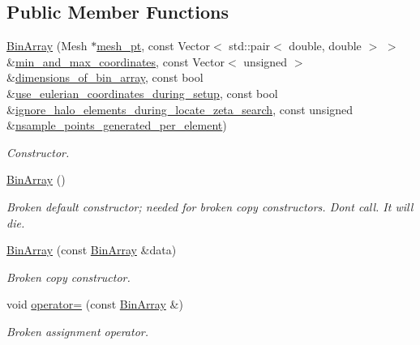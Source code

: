 \subsection*{Public Member Functions}
\begin{DoxyCompactItemize}
\item 
\hyperlink{classBinArray_ae441b5dcc0d0276f4661a09ff735b581}{Bin\+Array} (Mesh $\ast$\hyperlink{classSamplePointContainer_ae170916821b5f8f00255d251cd7f2d8c}{mesh\+\_\+pt}, const Vector$<$ std\+::pair$<$ double, double $>$ $>$ \&\hyperlink{classSamplePointContainer_a6799027f7c569176934457b17bfddf0f}{min\+\_\+and\+\_\+max\+\_\+coordinates}, const Vector$<$ unsigned $>$ \&\hyperlink{classBinArray_a527596c024da9b9baf817778af18704a}{dimensions\+\_\+of\+\_\+bin\+\_\+array}, const bool \&\hyperlink{classSamplePointContainer_a6b6b42a9e6bd8f116af8699e03a78d44}{use\+\_\+eulerian\+\_\+coordinates\+\_\+during\+\_\+setup}, const bool \&\hyperlink{classSamplePointContainer_a399d246c1afdfd993ceb80e6f2de1400}{ignore\+\_\+halo\+\_\+elements\+\_\+during\+\_\+locate\+\_\+zeta\+\_\+search}, const unsigned \&\hyperlink{classSamplePointContainer_a48e5ae762e0d56f67645ce4e7dd886d7}{nsample\+\_\+points\+\_\+generated\+\_\+per\+\_\+element})
\begin{DoxyCompactList}\small\item\em Constructor. \end{DoxyCompactList}\item 
\hyperlink{classBinArray_ae1bd440bc2eb6436158d306e26309eba}{Bin\+Array} ()
\begin{DoxyCompactList}\small\item\em Broken default constructor; needed for broken copy constructors. Don\textquotesingle{}t call. It will die. \end{DoxyCompactList}\item 
\hyperlink{classBinArray_a2e31e002f8c7ac1affc76c4ef48599a2}{Bin\+Array} (const \hyperlink{classBinArray}{Bin\+Array} \&data)
\begin{DoxyCompactList}\small\item\em Broken copy constructor. \end{DoxyCompactList}\item 
void \hyperlink{classBinArray_ae460c4ee2dd1e1f020a74fd9ec9b6a5e}{operator=} (const \hyperlink{classBinArray}{Bin\+Array} \&)
\begin{DoxyCompactList}\small\item\em Broken assignment operator. \end{DoxyCompactList}\item 

\end{DoxyCompactItemize}
